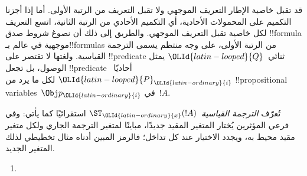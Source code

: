 \documentclass[../../../include/open-logic-section]{subfiles}
\begin{document}


قد تقبل خاصية الإطار التعريف الموجهي ولا تقبل التعريف من الرتبة
الأولى. أما إذا أجزنا التكميم على المحمولات الأحادية، أي التكميم
الأحادي من الرتبة الثانية، اتسع التعريف لكل خاصية تقبل التعريف
الموجهي. والطريق إلى ذلك أن نصوغ شروط صدق !!{formula} موجهية
في عالم بـ!!{formula}s من الرتبة الأولى، على وجه منتظم يسمى الترجمة
القياسية. ولغتها لا تقتصر على !!{predicate} ثنائي~$\OLId{latin-looped}{Q}$
يمثل الوصول، بل تجعل !!{predicate} أحاديًا~$\OLId{latin-looped}{P}_\OLId{latin-ordinary}{i}$ لكل ما يرد
من !!{propositional variable}s~$\Obj p_\OLId{latin-ordinary}{i}$ في~$!A$.

\begin{defn}
  تُعرّف \emph{الترجمة القياسية}~$\ST_\OLId{latin-ordinary}{x}(!A)$ استقرائيًا كما يأتي:
  وفي فرعي المؤثرين يُختار المتغير المقيد جديدًا، مباينًا لمتغير
  الترجمة الجاري ولكل متغير مقيد محيط به، ويجدد الاختيار عند كل تداخل؛
  فالرمز المبين أدناه مثال تخطيطي لذلك المتغير الجديد.
  \begin{enumerate}
  \item {}
  \end{enumerate}
\end{defn}
\end{document}
